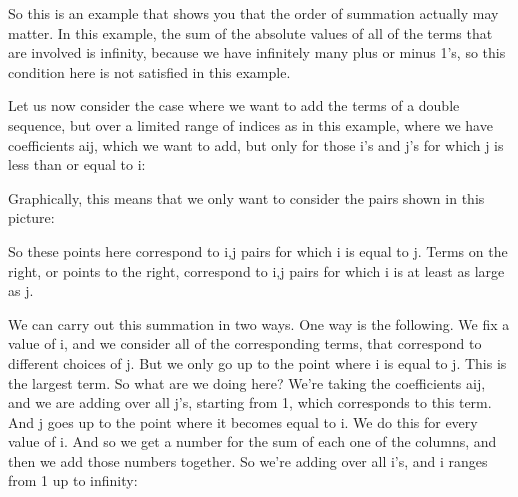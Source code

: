 \documentclass[pdftex, brazil, 12pt, twoside]{article}
\begin{document}
So this is an example that shows you that the order of
summation actually may matter.
In this example, the sum of the absolute values of all of
the terms that are involved is infinity, because we have
infinitely many plus or minus 1's, so this condition here is
not satisfied in this example.

Let us now consider the case where we want to add the terms
of a double sequence, but over a limited range of indices as
in this example, where we have coefficients aij, which we
want to add, but only for those i's and j's for which j
is less than or equal to i:

\begin{figure}[H]
  \begin{center}
  \end{center}
\end{figure}

Graphically, this means that we only want to consider the
pairs shown in this picture:

\begin{figure}[H]
  \begin{center}
  \end{center}
\end{figure}

So these points here correspond to i,j pairs for
which i is equal to j.
Terms on the right, or points to the right, correspond to
i,j pairs for which i is at least as large as j.

We can carry out this summation in two ways.
One way is the following.
We fix a value of i, and we consider all of the
corresponding terms, that correspond to different
choices of j.
But we only go up to the point where i is equal to j.
This is the largest term.
So what are we doing here?
We're taking the coefficients aij, and we are adding over
all j's, starting from 1, which
corresponds to this term.
And j goes up to the point where it becomes equal to i.
We do this for every value of i.
And so we get a number for the sum of each one of the
columns, and then we add those numbers together.
So we're adding over all i's, and i ranges
from 1 up to infinity:
\end{document}
